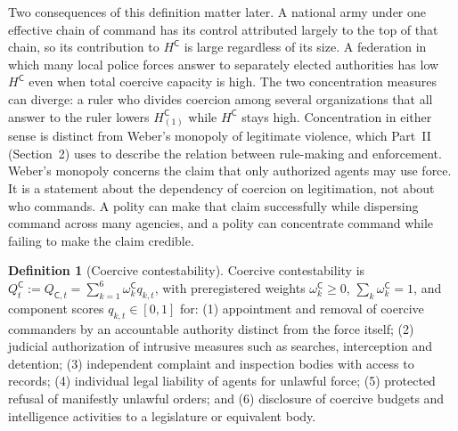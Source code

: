 \documentclass[11pt,letterpaper]{article}
\theoremstyle{definition}
\newtheorem{definition}[theorem]{Definition}
\theoremstyle{remark}
\newcommand{\pC}{\mathsf{C}}
\begin{document}
Two consequences of this definition matter later. A national army under one effective chain of command has its control attributed largely to the top of that chain, so its contribution to $H^{\pC}$ is large regardless of its size. A federation in which many local police forces answer to separately elected authorities has low $H^{\pC}$ even when total coercive capacity is high. The two concentration measures can diverge: a ruler who divides coercion among several organizations that all answer to the ruler lowers $H^{\pC}_{(1)}$ while $H^{\pC}$ stays high. Concentration in either sense is distinct from Weber's monopoly of legitimate violence, which Part~II (Section~2) uses to describe the relation between rule-making and enforcement. Weber's monopoly concerns the claim that only authorized agents may use force. It is a statement about the dependency of coercion on legitimation, not about who commands. A polity can make that claim successfully while dispersing command across many agencies, and a polity can concentrate command while failing to make the claim credible.

\begin{definition}[Coercive contestability]
\label{def:coercive-power:qc}
Coercive contestability is $Q^{\pC}_t := Q_{\pC,t} = \sum_{k=1}^{6} \omega^{\pC}_k q_{k,t}$, with preregistered weights $\omega^{\pC}_k \ge 0$, $\sum_k \omega^{\pC}_k = 1$, and component scores $q_{k,t} \in [0,1]$ for:
(1) appointment and removal of coercive commanders by an accountable authority distinct from the force itself;
(2) judicial authorization of intrusive measures such as searches, interception and detention;
(3) independent complaint and inspection bodies with access to records;
(4) individual legal liability of agents for unlawful force;
(5) protected refusal of manifestly unlawful orders; and
(6) disclosure of coercive budgets and intelligence activities to a legislature or equivalent body.
\end{definition}
\end{document}
